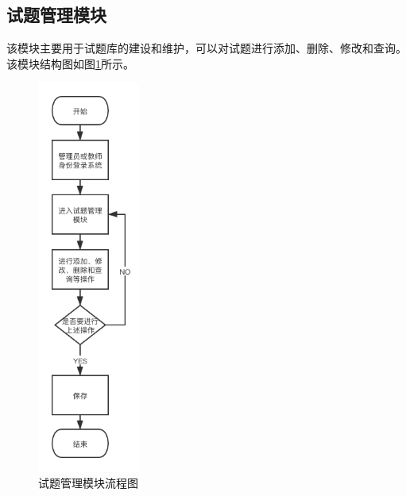 \subsection{试题管理模块}
该模块主要用于试题库的建设和维护，可以对试题进行添加、删除、修改和查询。该模块结构图如图\ref{figure:question}所示。
\begin{figure}[H]
\centering
\includegraphics[width=0.3\textwidth,keepaspectratio]{data/chapter-5/question.png}
\caption{试题管理模块流程图}
\label{figure:question}
\end{figure}
